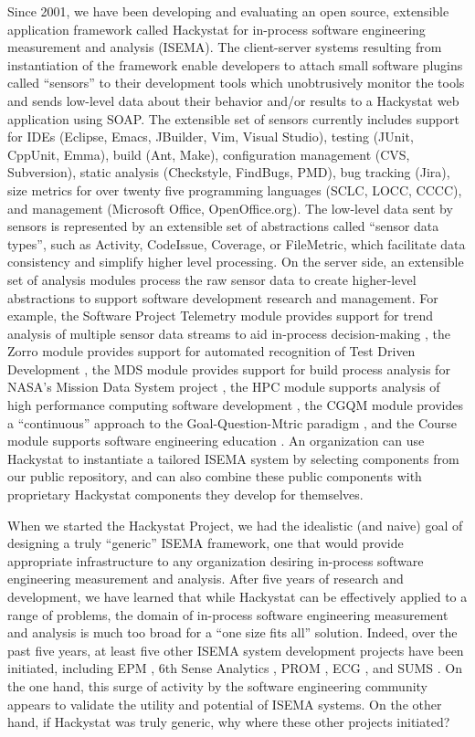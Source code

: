 \documentclass[10pt,twocolumn]{article}
\begin{document}
Since 2001, we have been developing and evaluating an open source,
extensible application framework called Hackystat for in-process software
engineering measurement and analysis (ISEMA).  The client-server systems
resulting from instantiation of the framework enable developers to attach
small software plugins called ``sensors'' to their development tools which
unobtrusively monitor the tools and sends low-level data about their
behavior and/or results to a Hackystat web application using SOAP. The
extensible set of sensors currently includes support for IDEs (Eclipse,
Emacs, JBuilder, Vim, Visual Studio), testing (JUnit, CppUnit, Emma), build
(Ant, Make), configuration management (CVS, Subversion), static analysis
(Checkstyle, FindBugs, PMD), bug tracking (Jira), size metrics for over
twenty five programming languages (SCLC, LOCC, CCCC), and management
(Microsoft Office, OpenOffice.org). The low-level data sent by sensors is
represented by an extensible set of abstractions called ``sensor data
types'', such as Activity, CodeIssue, Coverage, or FileMetric, which
facilitate data consistency and simplify higher level processing.  On the
server side, an extensible set of analysis modules process the raw sensor
data to create higher-level abstractions to support software development
research and management. For example, the Software Project Telemetry module
provides support for trend analysis of multiple sensor data streams to aid
in-process decision-making \cite{csdl2-04-11}, the Zorro module provides
support for automated recognition of Test Driven Development
\cite{csdl2-06-02}, the MDS module provides support for build process
analysis for NASA's Mission Data System project \cite{csdl2-03-07}, the HPC
module supports analysis of high performance computing software development
\cite{csdl2-04-22}, the CGQM module provides a ``continuous'' approach to
the Goal-Question-Mtric paradigm \cite{csdl2-05-09}, and the Course module
supports software engineering education \cite{csdl2-03-12}.  An
organization can use Hackystat to instantiate a tailored ISEMA system by
selecting components from our public repository, and can also combine these
public components with proprietary Hackystat components they develop for
themselves.

When we started the Hackystat Project, we had the idealistic (and naive)
goal of designing a truly ``generic'' ISEMA framework, one that would
provide appropriate infrastructure to any organization desiring in-process
software engineering measurement and analysis.  After five years of
research and development, we have learned that while Hackystat can be
effectively applied to a range of problems, the domain of in-process
software engineering measurement and analysis is much too broad for a ``one
size fits all'' solution.  Indeed, over the past five years, at least five
other ISEMA system development projects have been initiated, including EPM
\cite{EPM}, 6th Sense Analytics \cite{SixthSenseAnalytics}, PROM
\cite{PROM}, ECG \cite{ECG}, and SUMS \cite{SUMS}. On the one hand, this
surge of activity by the software engineering community appears to validate
the utility and potential of ISEMA systems.  On the other hand, if
Hackystat was truly generic, why where these other projects initiated?
\end{document}
